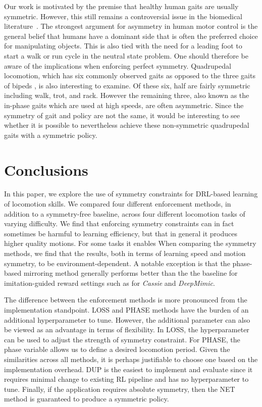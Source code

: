 
Our work is motivated by the premise that healthy human gaits are usually symmetric.  
However, this still remains a controversial issue in the biomedical literature~\cite{riskowski, SADEGHI200034}.  
The strongest argument for asymmetry in human motor control is the general belief that humans have a dominant side that is often the preferred choice for manipulating objects.  This is also tied with the need for a leading foot to start a walk or run cycle in the neutral state problem.  One should therefore be aware of the implications when enforcing perfect symmetry.
Quadrupedal locomotion, which has six commonly observed gaits as opposed to the three gaits of bipeds \cite{locomotion_mcmahon}, is also interesting to examine.  Of these six, half are fairly symmetric including walk, trot, and rack. However the remaining three, also known as the in-phase gaits which are used at high speeds, are often asymmetric. Since the symmetry of gait and policy are not the same, it would be interesting to see whether it is possible to nevertheless 
achieve these non-symmetric quadrupedal gaits with a symmetric policy.

\section{Conclusions}

In this paper, we explore the use of symmetry constraints for DRL-based learning of locomotion skills.
We compared four different enforcement methods, in addition to a symmetry-free baseline, 
across four different locomotion tasks of varying difficulty.  
We find that enforcing symmetry constraints can in fact sometimes be harmful to learning efficiency,
but that in general it produces higher quality motions.  For some tasks it enables 
When comparing the symmetry methods, we find that the results, both in terms of learning speed and motion symmetry, 
to be environment-dependent.  A notable exception is that the phase-based mirroring method generally 
performs better than the the baseline for imitation-guided reward settings such as for \textit{Cassie} and \textit{DeepMimic}.

The difference between the enforcement methods is more pronounced from the implementation standpoint.  
LOSS and PHASE methods have the burden of an additional hyperparameter to tune. 
However, the additional parameter can also be viewed as an advantage in terms of flexibility.  
In LOSS, the hyperparameter can be used to adjust the strength of symmetry constraint.  
For PHASE, the phase variable allows us to define a desired locomotion period. 
Given the similarities across all methods, it is perhaps justifiable to choose one based on the implementation overhead.  
DUP is the easiest to implement and evaluate since it requires minimal change to 
existing RL pipeline and has no hyperparameter to tune.  
Finally, if the application requires absolute symmetry, then the NET method is guaranteed to produce a symmetric policy.

